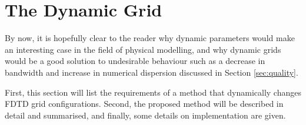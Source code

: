 \section{The Dynamic Grid}
By now, it is hopefully clear to the reader why dynamic parameters would make an interesting case in the field of physical modelling, and why dynamic grids would be a good solution to undesirable behaviour such as a decrease in bandwidth and increase in numerical dispersion discussed in Section \ref{sec:quality}. %

First, this section will list the requirements of a method that dynamically changes FDTD grid configurations. %
Second, the proposed method will be described in detail and summarised, and finally, some details on implementation are given. 

